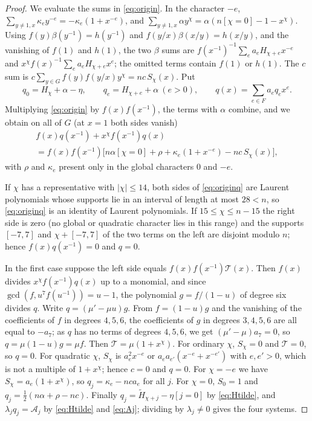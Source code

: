 \documentclass{amsart}
\theoremstyle{definition}
\theoremstyle{remark}
\numberwithin{equation}{section}
\begin{document}
\begin{proof}
We evaluate the sums in \eqref{eq:origin}. In the character $-e$,
$\sum_{y\ne1,x}\kappa_ey^{-e}=-\kappa_e(1+x^{-e})$, and
$\sum_{y\ne1,x}\alpha y^\chi=\alpha(n[\chi=0]-1-x^\chi)$. Using
$f(y)\beta(y^{-1})=h(y^{-1})$ and $f(y/x)\beta(x/y)=h(x/y)$, and the vanishing of
$f(1)$ and $h(1)$, the two $\beta$ sums are
$f(x^{-1})^{-1}\sum_ea_eH_{\chi+e}x^{-e}$ and $x^\chi f(x)^{-1}\sum_ea_eH_{\chi+e}x^e$;
the omitted terms contain $f(1)$ or $h(1)$. The $c$ sum is
$c\sum_{y\in G}f(y)f(y/x)y^\chi=nc\,S_\chi(x)$. Put
\[
  q_0=H_\chi+\alpha-\eta,\qquad q_e=H_{\chi+e}+\alpha\ (e>0),\qquad
  q(x)=\sum_{e\in F}a_eq_ex^e .
\]
Multiplying \eqref{eq:origin} by $f(x)f(x^{-1})$, the terms with $\alpha$ combine,
and we obtain on all of $G$ (at $x=1$ both sides vanish)
\begin{multline}\label{eq:originq}
  f(x)q(x^{-1})+x^\chi f(x^{-1})q(x)\\
   =f(x)f(x^{-1})\bigl[n\alpha[\chi=0]+\rho+\kappa_e(1+x^{-e})-nc\,S_\chi(x)\bigr],
\end{multline}
with $\rho$ and $\kappa_e$ present only in the global characters $0$ and $-e$.

If $\chi$ has a representative with $|\chi|\le14$, both sides of \eqref{eq:originq}
are Laurent polynomials whose supports lie in an interval of length at most $28<n$,
so \eqref{eq:originq} is an identity of Laurent polynomials. If $15\le\chi\le n-15$
the right side is zero (no global or quadratic character lies in this range) and the
supports $[-7,7]$ and $\chi+[-7,7]$ of the two terms on the left are disjoint modulo
$n$; hence $f(x)q(x^{-1})=0$ and $q=0$.

In the first case suppose the left side equals $f(x)f(x^{-1})\mathcal T(x)$. Then
$f(x)$ divides $x^\chi f(x^{-1})q(x)$ up to a monomial, and since
$\gcd(f,u^7f(u^{-1}))=u-1$, the polynomial $g=f/(1-u)$ of degree six divides $q$.
Write $q=(\mu'-\mu u)g$. From $f=(1-u)g$ and the vanishing of the coefficients of $f$ in
degrees $4,5,6$, the coefficients of $g$ in degrees $3,4,5,6$ are all equal to $-a_7$; as $q$
has no terms of degrees $4,5,6$, we get $(\mu'-\mu)a_7=0$, so $q=\mu(1-u)g=\mu f$.
Then $\mathcal T=\mu(1+x^\chi)$. For ordinary $\chi$, $S_\chi=0$ and $\mathcal T=0$,
so $q=0$. For quadratic $\chi$, $S_\chi$ is $a_e^2x^{-e}$ or $a_ea_{e'}(x^{-e}+x^{-e'})$
with $e,e'>0$, which is not a multiple of $1+x^\chi$; hence $c=0$ and $q=0$. For
$\chi=-e$ we have $S_\chi=a_e(1+x^\chi)$, so $q_j=\kappa_e-nca_e$ for all $j$. For
$\chi=0$, $S_0=1$ and $q_j=\tfrac12(n\alpha+\rho-nc)$. Finally
$q_j=\tilde H_{\chi+j}-\eta[j=0]$ by \eqref{eq:Htilde}, and
$\lambda_jq_j=\mathcal A_j$ by \eqref{eq:Htilde} and \eqref{eq:Aj}; dividing by
$\lambda_j\ne0$ gives the four systems.
\end{proof}
\end{document}
